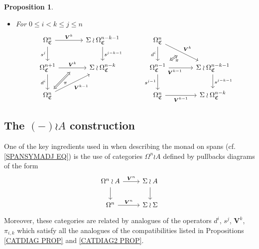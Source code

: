 \documentclass[a4paper,10pt
,draft
]{article}%
\numberwithin{equation}{section}
\numberwithin{figure}{section}
\newtheorem{proposition}[equation]{Proposition}%
\theoremstyle{definition} %
\newcommand{\1}{\ensuremath{\mathbbm 1}}%
\begin{document}
\begin{proposition}
\begin{itemize}
\item[(DF4)]
For $0 \leq i < k \leq j \leq n$
\begin{equation}
\begin{tikzcd}[row sep = 20pt, column sep = 35pt]
	\Omega^n_{\mathfrak{C}}
	\arrow{r}[swap,name=U]{}{\boldsymbol{V}^k} \arrow{d}[swap]{s^j} &
	\Sigma \wr \Omega^{n-k-1}_{\mathfrak{C}} \ar{d}{s^{j-k-1}}
&
	\Omega^n_{\mathfrak{C}}
	\arrow{dr}[swap,name=UUU]{}{\boldsymbol{V}^k} \arrow{d}[swap]{d^i} &
\\
	|[alias=V]|
	\Omega^{n+1}_{\mathfrak{C}} \ar{r}{\boldsymbol{V}^{k}}[swap,name=UU]{} \arrow{d}[swap]{d^i}&
	\Sigma \wr \Omega^{n-k}_{\mathfrak{C}}
&
	|[alias=VVV]|
	\Omega^{n-1}_{\mathfrak{C}} \ar{r}[near start, swap]{\boldsymbol{V}^{k-1}}[swap,name=UUUU]{} \ar{d}[swap]{s^{j-1}} &
	\Sigma \wr \Omega^{n-k-1}_{\mathfrak{C}} \ar{d}{s^{j-k-1}}
\\
	|[alias=VV]|
	\Omega^{n}_{\mathfrak{C}} \arrow{ur}[swap]{\boldsymbol{V}^{k-1}} &
&
	|[alias=VVVV]|
	\Omega^{n}_{\mathfrak{C}} \ar{r}[swap]{\boldsymbol{V}^{k-1}} &
	\Sigma \wr \Omega^{n-k}_{\mathfrak{C}}
\arrow[Leftrightarrow, from=VV, to=UU,shorten >=0.05cm,shorten <=0.05cm
,swap,"\pi"
]
\arrow[Leftrightarrow, from=VVV, to=UUU,shorten >=0.05cm,shorten <=0.05cm
,swap,"\pi"
]
\end{tikzcd}
\end{equation}
\end{itemize}
\end{proposition}




\subsection{The $(-)\wr A$ construction}\label{WRACONST SEC}


One of the key ingredients used in \cite{BP_geo} when describing the monad on spans (cf. \eqref{SPANSYMADJ EQ}) is the use of categories 
$\Omega^n \wr A$ defined by pullbacks diagrams of the form
\begin{equation}\label{WRASAMPLE EQ}
\begin{tikzcd}
	\Omega^n \wr A \ar{r}{\boldsymbol{V}^n} \ar{d} &
	\Sigma \wr A  \ar{d}
\\
	\Omega^n \ar{r}{\boldsymbol{V}^n} &
	\Sigma \wr \Sigma
\end{tikzcd}
\end{equation}
Moreover, these categories are related by analogues of the operators $d^i$, $s^j$, $\boldsymbol{V}^k$, $\pi_{i,k}$
which satisfy all the analogues of the compatibilities 
listed in Propositions \ref{CATDIAG PROP} and \ref{CATDIAG2 PROP}.
\end{document}
